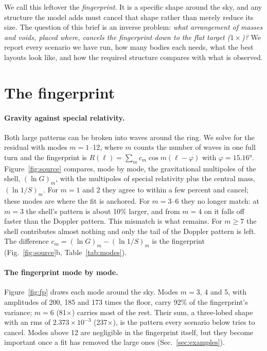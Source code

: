 \documentclass[aps,prd,twocolumn,nofootinbib,superscriptaddress,floatfix]{revtex4-2}
\newcommand{\fl}{\ensuremath{\times}}
\begin{document}
We call this leftover the \emph{fingerprint}. It is a specific shape around the sky, and any structure the model adds must cancel that shape rather than merely reduce its size. The question of this brief is an inverse problem: \emph{what arrangement of masses and voids, placed where, cancels the fingerprint down to the flat target ($1\times$)?} We report every scenario we have run, how many bodies each needs, what the best layouts look like, and how the required structure compares with what is observed.

\section{The fingerprint}
\paragraph*{Gravity against special relativity.} Both large patterns can be broken into waves around the ring. We solve for the residual with modes $m=1$--12, where $m$ counts the number of waves in one full turn and the fingerprint is $R(\ell)=\sum_m c_m\cos m(\ell-\varphi)$ with $\varphi=\ang{15.16}$. Figure~\ref{fig:source} compares, mode by mode, the gravitational multipoles of the shell, $(\ln G)_m$, with the multipoles of special relativity plus the central mass, $(\ln 1/S)_m$. For $m=1$ and 2 they agree to within a few percent and cancel; these modes are where the fit is anchored. For $m=3$--6 they no longer match: at $m=3$ the shell's pattern is about 10\% larger, and from $m=4$ on it falls off faster than the Doppler pattern. This mismatch is what remains. For $m\geq7$ the shell contributes almost nothing and only the tail of the Doppler pattern is left. The difference $c_m=(\ln G)_m-(\ln 1/S)_m$ is the fingerprint (Fig.~\ref{fig:source}b, Table~\ref{tab:modes}).

\paragraph*{The fingerprint mode by mode.} Figure~\ref{fig:fp} draws each mode around the sky. Modes $m=3$, 4 and 5, with amplitudes of 200, 185 and 173 times the floor, carry 92\% of the fingerprint's variance; $m=6$ (81\fl) carries most of the rest. Their sum, a three-lobed shape with an rms of $2.373\times10^{-3}$ (237\fl), is the pattern every scenario below tries to cancel. Modes above 12 are negligible in the fingerprint itself, but they become important once a fit has removed the large ones (Sec.~\ref{sec:examples}).
\end{document}
